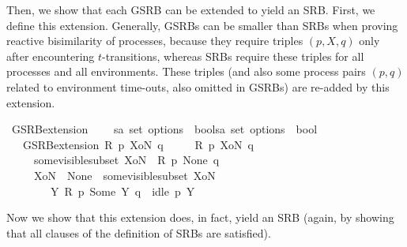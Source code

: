 \begin{isabellebody}
%
\endisatagproof
{\isafoldproof}%
%
\isadelimproof
%
\endisadelimproof
%
\begin{isamarkuptext}%
Then, we show that each GSRB can be extended to yield an SRB. First, we define this extension. Generally, GSRBs can be smaller than SRBs when proving reactive bisimilarity of processes, because they require triples $(p,X,q)$ only after encountering $t$-transitions, whereas SRBs require these triples for all processes and all environments. These triples (and also some process pairs $(p,q)$ related to environment time-outs, also omitted in GSRBs) are re-added by this extension.
\pagebreak%
\end{isamarkuptext}\isamarkuptrue%
\isamarkupfalse%
\ GSRB{\isacharunderscore}{\kern0pt}extension\ \isanewline
\ \ {\isacharcolon}{\kern0pt}{\isacharcolon}{\kern0pt}\ {\isacartoucheopen}{\isacharparenleft}{\kern0pt}{\isacharprime}{\kern0pt}s{\isasymRightarrow}{\isacharprime}{\kern0pt}a\ set\ option{\isasymRightarrow}{\isacharprime}{\kern0pt}s\ {\isasymRightarrow}\ bool{\isacharparenright}{\kern0pt}{\isasymRightarrow}{\isacharparenleft}{\kern0pt}{\isacharprime}{\kern0pt}s{\isasymRightarrow}{\isacharprime}{\kern0pt}a\ set\ option{\isasymRightarrow}{\isacharprime}{\kern0pt}s\ {\isasymRightarrow}\ bool{\isacharparenright}{\kern0pt}{\isacartoucheclose}\isanewline
\ \ \ {\isacartoucheopen}{\isacharparenleft}{\kern0pt}GSRB{\isacharunderscore}{\kern0pt}extension\ R{\isacharparenright}{\kern0pt}\ p\ XoN\ q\ {\isasymequiv}\isanewline
\ \ \ \ {\isacharparenleft}{\kern0pt}R\ p\ XoN\ q{\isacharparenright}{\kern0pt}\isanewline
\ \ \ \ {\isasymor}\ {\isacharparenleft}{\kern0pt}some{\isacharunderscore}{\kern0pt}visible{\isacharunderscore}{\kern0pt}subset\ XoN\ {\isasymand}\ R\ p\ None\ q{\isacharparenright}{\kern0pt}\isanewline
\ \ \ \ {\isasymor}\ {\isacharparenleft}{\kern0pt}{\isacharparenleft}{\kern0pt}XoN\ {\isacharequal}{\kern0pt}\ None\ {\isasymor}\ some{\isacharunderscore}{\kern0pt}visible{\isacharunderscore}{\kern0pt}subset\ XoN{\isacharparenright}{\kern0pt}\ \isanewline
\ \ \ \ \ \ {\isasymand}\ {\isacharparenleft}{\kern0pt}{\isasymexists}\ Y{\isachardot}{\kern0pt}\ R\ p\ {\isacharparenleft}{\kern0pt}Some\ Y{\isacharparenright}{\kern0pt}\ q\ {\isasymand}\ idle\ p\ Y{\isacharparenright}{\kern0pt}{\isacharparenright}{\kern0pt}{\isacartoucheclose}%
\begin{isamarkuptext}%
Now we show that this extension does, in fact, yield an SRB (again, by showing that all clauses of the definition of SRBs are satisfied).%
\end{isamarkuptext}\isamarkuptrue%

\end{isabellebody}
